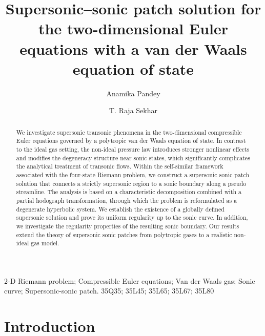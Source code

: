 \documentclass[3p,11pt]{elsarticle}
\date{}
\numberwithin{equation}{section}
\begin{document}
\begin{frontmatter} 
\title{Supersonic–sonic patch solution for the two-dimensional Euler equations with a van der Waals equation of state } 
\author[1]{Anamika Pandey}
\author[1]{T. Raja Sekhar}
\address[1]{Department of Mathematics, Indian Institute of Technology Kharagpur, Kharagpur, West Bengal, India} 

\begin{abstract}
We investigate supersonic transonic phenomena in the two-dimensional compressible Euler equations governed by a polytropic van der Waals equation of state. In contrast to the ideal gas setting, the non-ideal pressure law introduces stronger nonlinear effects and modifies the degeneracy structure near sonic states, which significantly complicates the analytical treatment of transonic flows. Within the self-similar framework associated with the four-state Riemann problem, we construct a supersonic sonic patch solution that connects a strictly supersonic region to a sonic boundary along a pseudo streamline. The analysis is based on a characteristic decomposition combined with a partial hodograph transformation, through which the problem is reformulated as a degenerate hyperbolic system. We establish the existence of a globally defined supersonic solution and prove its uniform regularity up to the sonic curve. In addition, we investigate the regularity properties of the resulting sonic boundary. Our results extend the theory of supersonic sonic patches from polytropic gases to a realistic non-ideal gas model.
\end{abstract}

\begin{keyword}
   2-D Riemann problem; Compressible Euler equations; Van der Waals gas; Sonic curve; Supersonic-sonic patch.
  \MSC[] 35Q35; 35L45; 35L65; 35L67; 35L80
\end{keyword}
\end{frontmatter}
\section{Introduction}
\end{document}
